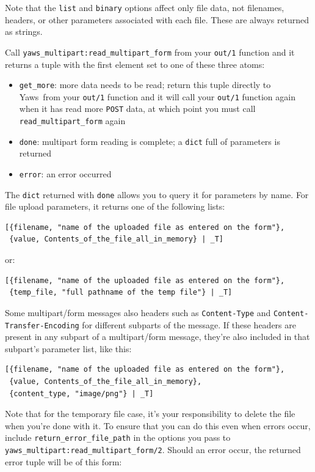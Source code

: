\documentclass[11pt,oneside,english]{book}
\newcommand{\Yaws}            %
        {{\sc Yaws}}
\begin{document}
Note that the \verb+list+ and \verb+binary+ options affect only file
data, not filenames, headers, or other parameters associated with each
file. These are always returned as strings.

Call \verb+yaws_multipart:read_multipart_form+ from your \verb+out/1+
function and it returns a tuple with the first element set to one of
these three atoms:

\begin{itemize}
\item \verb+get_more+: more data needs to be read; return this tuple
  directly to \Yaws\ from your \verb+out/1+ function and it will call
  your \verb+out/1+ function again when it has read more \verb+POST+
  data, at which point you must call \verb+read_multipart_form+ again
\item \verb+done+: multipart form reading is complete; a
  \verb+dict+ full of parameters is returned
\item \verb+error+: an error occurred
\end{itemize}

The \verb+dict+ returned with \verb+done+ allows you to query it for
parameters by name. For file upload parameters, it returns one of the
following lists:

\begin{verbatim}
[{filename, "name of the uploaded file as entered on the form"},
 {value, Contents_of_the_file_all_in_memory} | _T]
\end{verbatim}

or:

\begin{verbatim}
[{filename, "name of the uploaded file as entered on the form"},
 {temp_file, "full pathname of the temp file"} | _T]
\end{verbatim}

Some multipart/form messages also headers such as \verb+Content-Type+
and \verb+Content-Transfer-Encoding+ for different subparts of the
message. If these headers are present in any subpart of a
multipart/form message, they're also included in that subpart's
parameter list, like this:

\begin{verbatim}
[{filename, "name of the uploaded file as entered on the form"},
 {value, Contents_of_the_file_all_in_memory},
 {content_type, "image/png"} | _T]
\end{verbatim}

Note that for the temporary file case, it's your responsibility to
delete the file when you're done with it. To ensure that you can do
this even when errors occur, include \verb+return_error_file_path+ in
the options you pass to
\verb+yaws_multipart:read_multipart_form/2+. Should an error occur,
the returned error tuple will be of this form:
\end{document}
